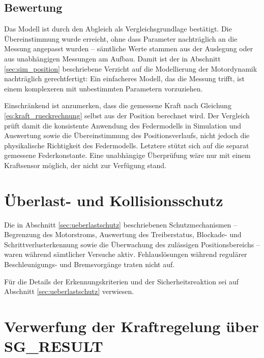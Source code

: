 \subsection*{Bewertung}

Das Modell ist durch den Abgleich als Vergleichsgrundlage bestätigt. Die Übereinstimmung
wurde erreicht, ohne dass Parameter nachträglich an die Messung angepasst wurden --
sämtliche Werte stammen aus der Auslegung oder aus unabhängigen Messungen am Aufbau. Damit
ist der in Abschnitt \ref{sec:sim_position} beschriebene Verzicht auf die Modellierung der
Motordynamik nachträglich gerechtfertigt: Ein einfacheres Modell, das die Messung trifft,
ist einem komplexeren mit unbestimmten Parametern vorzuziehen.

Einschränkend ist anzumerken, dass die gemessene Kraft nach Gleichung
\ref{eq:kraft_rueckrechnung} selbst aus der Position berechnet wird. Der Vergleich prüft
damit die konsistente Anwendung des Federmodells in Simulation und Auswertung sowie die
Übereinstimmung des Positionsverlaufs, nicht jedoch die physikalische Richtigkeit des
Federmodells. Letztere stützt sich auf die separat gemessene Federkonstante. Eine
unabhängige Überprüfung wäre nur mit einem Kraftsensor möglich, der nicht zur Verfügung
stand.

\section{Überlast- und Kollisionsschutz}
\label{sec:ergebnis_schutz}

Die in Abschnitt \ref{sec:ueberlastschutz} beschriebenen Schutzmechanismen -- Begrenzung
des Motorstroms, Auswertung des Treiberstatus, Blockade- und Schrittverlusterkennung sowie
die Überwachung des zulässigen Positionsbereichs -- waren während sämtlicher Versuche
aktiv. Fehlauslösungen während regulärer Beschleunigungs- und Bremsvorgänge traten nicht
auf.

Für die Details der Erkennungskriterien und der Sicherheitsreaktion sei auf Abschnitt
\ref{sec:ueberlastschutz} verwiesen.

\section{Verwerfung der Kraftregelung über SG\_RESULT}
\label{sec:sg_verwerfung}

